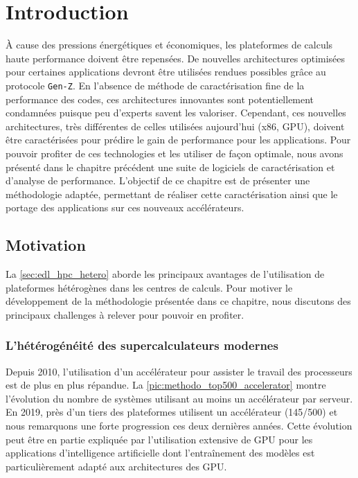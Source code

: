 \section{Introduction}\label{sec:methodo_intro}

À cause des pressions énergétiques et économiques, les plateformes de calculs haute performance doivent être repensées. De nouvelles architectures optimisées pour certaines applications devront être utilisées rendues possibles grâce au protocole \verb=Gen-Z=. En l'absence de méthode de caractérisation fine de la performance des codes, ces architectures innovantes sont potentiellement condamnées puisque peu d'experts savent les valoriser. Cependant, ces nouvelles architectures, très différentes de celles utilisées aujourd'hui (x86, GPU), doivent être caractérisées pour prédire le gain de performance pour les applications. Pour pouvoir profiter de ces technologies et les utiliser de façon optimale, nous avons présenté dans le chapitre précédent une suite de logiciels de caractérisation et d'analyse de performance. L'objectif de ce chapitre est de présenter une méthodologie adaptée,  permettant de réaliser cette caractérisation ainsi que le portage des applications sur ces nouveaux accélérateurs.



\subsection{Motivation}

    La \autoref{sec:edl_hpc_hetero} aborde les principaux avantages de l'utilisation de plateformes hétérogènes dans les centres de calculs. Pour motiver le développement de la méthodologie présentée dans ce chapitre, nous discutons des principaux challenges à relever pour pouvoir en profiter.
       
    \subsubsection{L'hétérogénéité des supercalculateurs modernes}\label{sec:methodo_intro_hetero}
        
        Depuis 2010, l'utilisation d'un accélérateur pour assister le travail des processeurs est de plus en plus répandue. La \autoref{pic:methodo_top500_accelerator} montre l'évolution du nombre de systèmes utilisant au moins un accélérateur par serveur. En 2019, près d'un tiers des plateformes utilisent un accélérateur (145/500) et nous remarquons une forte progression ces deux dernières années.  Cette évolution peut être en partie expliquée par l'utilisation extensive de GPU pour les applications d'intelligence artificielle dont l'entraînement des modèles est particulièrement adapté aux architectures des GPU.
        
